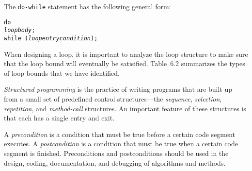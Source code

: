 \begin{SMBL}
\item The {\tt do-while} statement has the following general form:

\begin{jjjlisting}
\begin{alltt}
{\tt do} 
    {\it loop body} ;
{\tt while (} {\it loop entry condition} {\tt )} ;
\end{alltt}
\end{jjjlisting}

\item When designing a loop, it is important to analyze the loop
structure to make sure that the loop bound will eventually be
satisified. Table~6.2 summarizes the types of loop bounds that
we have identified.

\item  {\it Structured programming}
is the practice of writing programs that are built up from a small set
of predefined control structures---the {\it sequence},
{\it selection}, {\it repetition}, and {\it method-call} structures. An
important feature of these structures is that each has a single entry
and exit.

\item A {\it precondition} is a condition that must be true before a
certain code segment executes. A {\it postcondition} is a condition
that must be true when a certain code segment is
finished. Preconditions and postconditions should be used in the
design, coding, documentation, and debugging of algorithms and
methods.

\end{SMBL}


